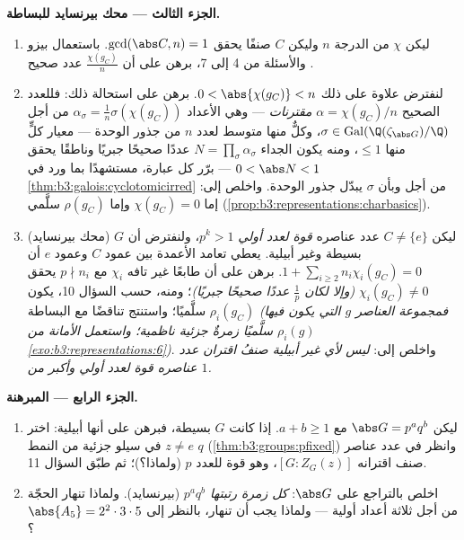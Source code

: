 \begin{problem}
\medskip
\noindent\textbf{الجزء الثالث --- محك بيرنسايد للبساطة.}
\begin{enumerate}[resume]
  \item ليكن $\chi$  من الدرجة $n$ وليكن $C$
        صنفًا يحقق $\gcd(\abs C, n) = 1$. باستعمال بيزو والأسئلة من 4 إلى 7،
        برهن على أن $\frac{\chi(g_C)}{n}$ عدد صحيح .
  \item لنفترض علاوة على ذلك $0 < \abs{\chi(g_C)} < n$. برهن على استحالة ذلك:
        فللعدد الصحيح  $\alpha =
        \chi(g_C)/n$ \emph{مقترنات} --- وهي الأعداد
        $\alpha_\sigma = \frac1n\sigma(\chi(g_C))$ من أجل $\sigma \in \operatorname{Gal}(\Q(\zeta_{\abs G})/\Q)$، وكلٌّ منها متوسط لعدد $n$ من جذور
        الوحدة --- معيار كلٍّ منها $\leq 1$، ومنه يكون الجداء
        $N = \prod_\sigma\alpha_\sigma$ عددًا صحيحًا جبريًا وناطقًا يحقق
        $0 < \abs N < 1$ --- برّر كل عبارة، مستشهدًا بما ورد في \cref{thm:b3:galois:cyclotomicirred}
        من أجل  وبأن $\sigma$ يبدّل جذور الوحدة. واخلص
        إلى: إما $\chi(g_C) = 0$ وإما $\rho(g_C)$ سلَّمي
        (\cref{prop:b3:representations:charbasics}).
  \item (محك بيرنسايد) ليكن $C \neq \{e\}$  عدد
        عناصره \emph{قوة لعدد أولي} $p^k > 1$، ولنفترض أن $G$
        بسيطة وغير أبيلية. يعطي تعامد الأعمدة بين عمود $C$ وعمود
        $e$ أن $1 + \sum_{i \geq 2} n_i\chi_i(g_C) = 0$. برهن على أن طابعًا غير تافه $\chi_i$ مع
        $p \nmid n_i$ يحقق $\chi_i(g_C) \neq 0$ \emph{(وإلا لكان $\frac1p$
        عددًا صحيحًا جبريًا)}؛ ومنه، حسب السؤال 10، يكون
        $\rho_i(g_C)$ سلَّميًا؛ واستنتج تناقضًا مع البساطة
        \emph{(فمجموعة العناصر $g$ التي يكون فيها $\rho_i(g)$
        سلَّميًا زمرةٌ جزئية ناظمية؛ واستعمل الأمانة من
        \cref{exo:b3:representations:6})}. واخلص إلى: \emph{ليس لأي  غير
        أبيلية صنفُ اقتران عدد عناصره قوة لعدد أولي وأكبر من
        $1$.}
\end{enumerate}

\medskip
\noindent\textbf{الجزء الرابع --- المبرهنة.}
\begin{enumerate}[resume]
  \item ليكن $\abs G = p^aq^b$ مع $a + b \geq 1$. إذا كانت $G$ بسيطة،
        فبرهن على أنها أبيلية: اختر $z \neq e$ في  سيلو
        جزئية من النمط $q$ (\cref{thm:b3:groups:pfixed}) وانظر في عدد عناصر صنف
        اقترانه $[G : Z_G(z)]$، وهو قوة للعدد $p$ (ولماذا؟)؛ ثم
        طبّق السؤال 11.
  \item اخلص بالتراجع على $\abs G$: \emph{كل زمرة رتبتها
        $p^aq^b$ } (بيرنسايد). ولماذا تنهار الحجّة من
        أجل ثلاثة أعداد أولية --- ولماذا يجب أن تنهار، بالنظر
        إلى $\abs{A_5} = 2^2\cdot3\cdot5$؟
\end{enumerate}


\end{problem}
